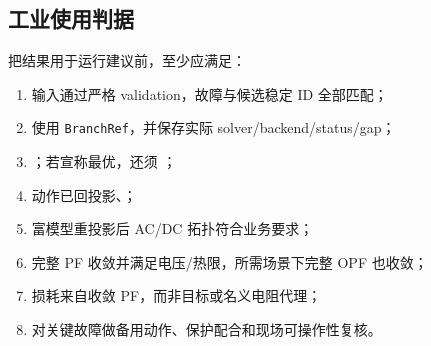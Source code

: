 \subsection{工业使用判据}

把结果用于运行建议前，至少应满足：
\begin{enumerate}
  \item 输入通过严格 validation，故障与候选稳定 ID 全部匹配；
  \item 使用 \texttt{BranchRef}，并保存实际 solver/backend/status/gap；
  \item {}；若宣称最优，还须 ；
  \item 动作已回投影、；
  \item 富模型重投影后 AC/DC 拓扑符合业务要求；
  \item 完整 PF 收敛并满足电压/热限，所需场景下完整 OPF 也收敛；
  \item 损耗来自收敛 PF，而非目标或名义电阻代理；
  \item 对关键故障做备用动作、保护配合和现场可操作性复核。
\end{enumerate}

